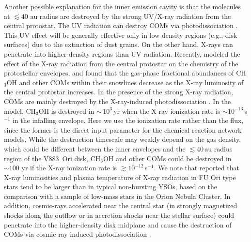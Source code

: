 \documentclass[linenumbers, twocolumn, twocolappendix, astrosymb, times]{aastex631}
\newcommand{\methanol}{CH$_3$OH\xspace}
\begin{document}
Another possible explanation for the inner emission cavity is that the molecules at $\lesssim40$ au radius are destroyed by the strong UV/X-ray radiation from the central protostar. The UV radiation can destroy COMs via photodissociation \citep[e.g.,][]{Garrod2006, Oberg2009}. This UV effect will be generally effective only in low-density regions (e.g., disk surfaces) due to the 
extinction of dust grains.
On the other hand, X-rays can penetrate into higher-density regions than UV radiation.
Recently, \citet{Notsu2021} modeled the effect of the X-ray radiation from the central protostar on the chemistry of the protostellar envelopes, and found that the gas-phase fractional abundances of \methanol and other COMs within their snowlines decrease as the X-ray luminosity of the central protostar increases. In the presence of the strong X-ray radiation, COMs are mainly destroyed by the X-ray-induced photodissociation \citep[e.g.,][]{Garrod2006, Taquet2016, Notsu2021}. 
In the \citet{Notsu2021} model, \methanol is destroyed in $\sim\,10^3$\,yr when the X-ray ionization rate is $\sim10^{-13}$\,s$^{-1}$ in the infalling envelope. Here we use the ionization rate rather than the flux, since the former is the direct input parameter for the chemical reaction network models. While the destruction timescale may weakly depend on the gas density, which could be different between the inner envelopes and the $\lesssim40$\,au radius region of the V883~Ori disk, \methanol and other COMs could be destroyed in $\sim100$ yr if the X-ray ionization rate is $\gtrsim 10^{-12}$\,s$^{-1}$.
We note that \citet{Kuhn2019} reported that X-ray luminosities and plasma temperature of X-ray radiation in FU Ori type stars tend to be larger than in typical non-bursting YSOs, based on the comparison with a sample of low-mass stars in the Orion Nebula Cluster.
In addition, cosmic-rays accelerated near the central star (in strongly magnetized shocks along the outflow or in accretion shocks near the stellar surface) could penetrate into the higher-density disk midplane and cause the destruction of COMs via cosmic-ray-induced photodissociation \citep[e.g.,][]{Padovani2020, Cabedo2023}.

\end{document}
